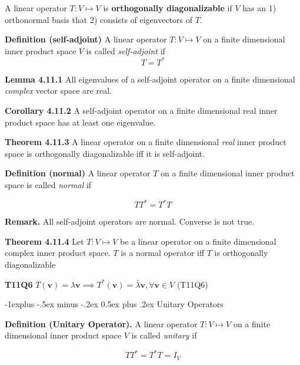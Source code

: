 \documentclass[10pt,landscape]{article}
\makeatletter
\renewcommand{\subsection}{\@startsection{subsection}{2}{0mm}%
                                {-1explus -.5ex minus -.2ex}%
                                {0.5ex plus .2ex}%
                                {\normalfont\normalsize\bfseries}}
\makeatother
\begin{document}
\begin{multicols}{4}
A linear operator $T: V \mapsto V$ is \textbf{orthogonally diagonalizable} if $V$ has an 1) orthonormal basis that 2) consists of eigenvectors of $T$.

\textbf{Definition (self-adjoint)} A linear operator $T: V \mapsto V$ on a finite dimensional inner product space $V$ is called \textit{self-adjoint} if
$$
T = T^*
$$

\textbf{Lemma 4.11.1} All eigenvalues of a self-adjoint operator on a finite dimensional \textit{complex} vector space are real.

\textbf{Corollary 4.11.2} A self-adjoint operator on a finite dimensional real inner product space has at least one eigenvalue.

\textbf{Theorem 4.11.3} A linear operator on a finite dimensional \textit{real} inner product space is orthogonally diagonalizable iff it is self-adjoint.

\textbf{Definition (normal)} A linear operator $T$ on a finite dimensional inner product space is called \textit{normal} if 

$$
TT^* = T^*T
$$

\textbf{Remark.} All self-adjoint operators are normal. Converse is not true.


\textbf{Theorem 4.11.4} Let $T: V \mapsto V$ be a linear operator on a finite dimensional complex inner product space. $T$ is a normal operator iff $T$ is orthogonally diagonalizable 



\textbf{T11Q6} $T(\mathbf{v}) = \lambda \mathbf{v} \implies T^*(\mathbf{v}) = \bar{\lambda} \mathbf{v}, \forall \mathbf{v} \in V$ (T11Q6)

\subsection{Unitary Operators}

\textbf{Definition (Unitary Operator).} A linear operator $T: V \mapsto V$ on a finite dimensional inner product space $V$ is called \textit{unitary} if 

$$
TT^* = T^*T = I_V
$$


\end{multicols}
\end{document}
